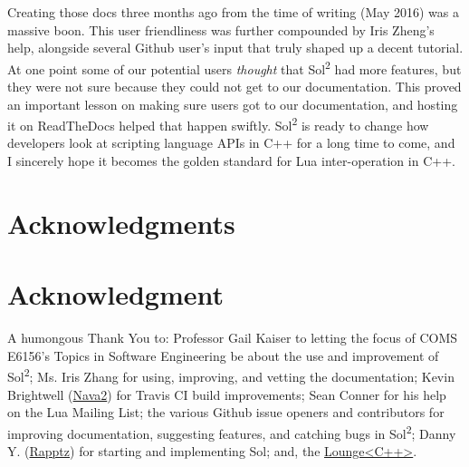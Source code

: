 \documentclass[conference,compsoc]{IEEEtran}
\newcommand{\loungecxx}{Lounge\textless{}C++\textgreater{}}
\newcommand{\soltwo}{Sol\textsuperscript{2}}
\begin{document}
Creating those docs three months ago from the time of writing (May 2016) was a massive boon. This user friendliness was further compounded by Iris Zheng's help, alongside several Github user's input that truly shaped up a decent tutorial. At one point some of our potential users \emph{thought} that \soltwo{} had more features, but they were not sure because they could not get to our documentation. This proved an important lesson on making sure users got to our documentation, and hosting it on ReadTheDocs helped that happen swiftly. \soltwo{} is ready to change how developers look at scripting language APIs in C++ for a long time to come, and I sincerely hope it becomes the golden standard for Lua inter-operation in C++.

\ifCLASSOPTIONcompsoc
  \section*{Acknowledgments}
\else
  \section*{Acknowledgment}
\fi

A humongous Thank You to: Professor Gail Kaiser to letting the focus of COMS E6156's Topics in Software Engineering be about the use and improvement of \soltwo{}; Ms. Iris Zhang for using, improving, and vetting the documentation; Kevin Brightwell (\href{https://github.com/Nava2}{Nava2}) for Travis CI build improvements; Sean Conner for his help on the Lua Mailing List; the various Github issue openers and contributors for improving documentation, suggesting features, and catching bugs in \soltwo{}; Danny Y. (\href{https://github.com/Rapptz}{Rapptz}) for starting and implementing Sol; and, the \href{http://loungecpp.net/}{\loungecxx{}}.






%




\end{document}
